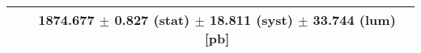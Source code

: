 \begin{tabular}{lc}
\hline
                               & 1874.677 $\pm$ 0.827 (stat) $\pm$ 18.811 (syst) $\pm$ 33.744 (lum) [pb]  \\
\hline
\end{tabular}
